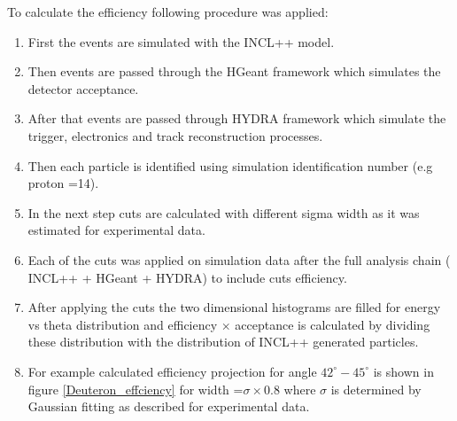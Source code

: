 To calculate the efficiency following procedure was applied:
\begin{enumerate}[label=\roman*)]
    \item First the events are simulated with the INCL++ model.
    \item Then events are passed through the HGeant framework which simulates the detector acceptance.
    \item After that events are passed through HYDRA framework which simulate the trigger, electronics and track reconstruction processes.
    \item Then each particle is identified using simulation identification number (e.g proton =14).
    \item In the next step cuts are calculated with different sigma width as it was estimated for experimental data.
    \item Each of the cuts was applied on simulation data after the full analysis chain ( INCL++ + HGeant + HYDRA) to include  cuts efficiency.
    \item After applying the cuts the two dimensional histograms are filled for energy vs theta distribution and efficiency $\times$ acceptance is calculated by dividing these distribution with the distribution of INCL++ generated particles.
        \label{Deuteron_effciency}
    \item For example calculated efficiency projection for angle $42^\circ-45^\circ$ is shown in figure \ref{Deuteron_effciency}  for width =$\sigma \times 0.8$  where $\sigma$ is determined by Gaussian fitting as described for experimental data.
    
\end{enumerate}



\hspace{5cm}

